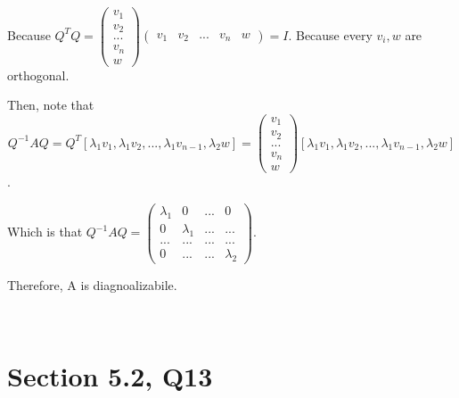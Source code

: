 \documentclass[12pt]{article}%
\begin{document}
Because $Q^{T}Q=\begin{pmatrix}v_1 \\ v_2 \\ ... \\ v_n \\ w\end{pmatrix} \begin{pmatrix}v_1 & v_2 & ... & v_n & w\end{pmatrix}= I.$ Because every $v_i,w$ are orthogonal.

Then, note that $$Q^{-1}AQ=Q^{T}[\lambda_1 v_1,\lambda_1 v_2,...,\lambda_1 v_{n-1}, \lambda_2 w ]=\begin{pmatrix}v_1 \\ v_2 \\ ... \\ v_n \\ w\end{pmatrix} [\lambda_1 v_1,\lambda_1 v_2,...,\lambda_1 v_{n-1}, \lambda_2 w ]$$.

Which is that $Q^{-1}AQ=\begin{pmatrix} \lambda_1&0&...&0\\0&\lambda_1&...&...\\...&...&...&...\\0&...&...&\lambda_2 \end{pmatrix}.$

Therefore, A is diagnoalizabile.


~\ 






\section{Section 5.2, Q13}

~\ 
\end{document}
